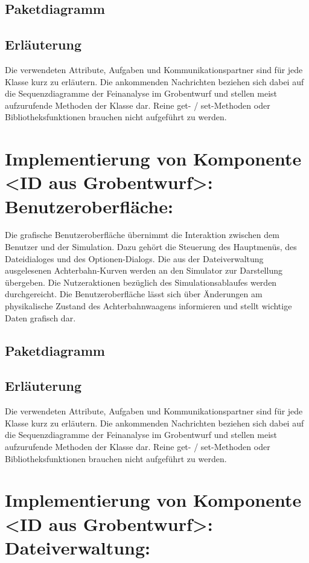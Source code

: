 \subsection{Paketdiagramm}
\subsection{Erläuterung}

Die verwendeten Attribute, Aufgaben und Kommunikationspartner sind für jede
Klasse kurz zu erläutern. Die ankommenden Nachrichten beziehen sich dabei auf
die Sequenzdiagramme der Feinanalyse im Grobentwurf und stellen meist
aufzurufende Methoden der Klasse dar.  Reine get- / set-Methoden oder
Bibliotheksfunktionen brauchen nicht aufgeführt zu werden.

\section{Implementierung von Komponente
         <ID aus Grobentwurf>: Benutzeroberfläche:}

Die grafische Benutzeroberfläche übernimmt die Interaktion zwischen dem Benutzer und
der Simulation. Dazu gehört die Steuerung des Hauptmenüs, des Dateidialoges und
des Optionen-Dialogs. Die aus der Dateiverwaltung ausgelesenen Achterbahn-Kurven 
werden an den Simulator zur Darstellung übergeben. Die Nutzeraktionen bezüglich des
Simulationsablaufes werden durchgereicht. Die Benutzeroberfläche lässt sich über
Änderungen am physikalische Zustand des Achterbahnwaagens informieren und stellt
wichtige Daten grafisch dar.

\subsection{Paketdiagramm}
\subsection{Erläuterung}

Die verwendeten Attribute, Aufgaben und Kommunikationspartner sind für jede
Klasse kurz zu erläutern. Die ankommenden Nachrichten beziehen sich dabei auf
die Sequenzdiagramme der Feinanalyse im Grobentwurf und stellen meist
aufzurufende Methoden der Klasse dar.  Reine get- / set-Methoden oder
Bibliotheksfunktionen brauchen nicht aufgeführt zu werden.

\section{Implementierung von Komponente
         <ID aus Grobentwurf>: Dateiverwaltung:}

